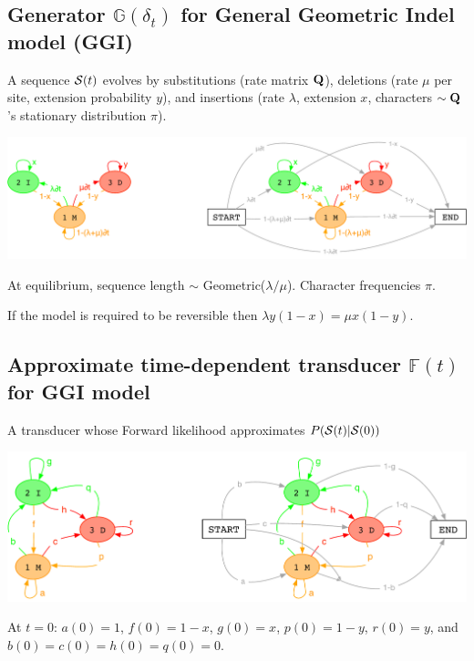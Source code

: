 \documentclass{article}
\begin{document}
\subsection{Generator $\mathbb{G}(\delta_t)$ for General Geometric Indel model (GGI)}

A sequence ${\cal S}(t)$ evolves by
substitutions (rate matrix ${\bf Q}$),
deletions (rate $\mu$ per site, extension probability $y$),
and
insertions (rate $\lambda$, extension $x$,
characters $\sim {\bf Q}$'s stationary distribution $\pi$).

\includegraphics[width=\textwidth]{InstantHMM.pdf}

At equilibrium, sequence length $\sim$ Geometric($\lambda/\mu$). Character frequencies $\pi$.

If the model is required to be reversible then $\lambda y(1-x) = \mu x(1-y)$.

\subsection{Approximate time-dependent transducer $\mathbb{F}(t)$ for GGI model}

A transducer whose Forward likelihood approximates $P({\cal S}(t)|{\cal S}(0))$

\includegraphics[width=\textwidth]{PairHMM.pdf}

At $t=0$: $a(0)=1$, $f(0)=1-x$, $g(0)=x$, $p(0)=1-y$, $r(0)=y$, and $b(0)=c(0)=h(0)=q(0)=0$.
\end{document}
